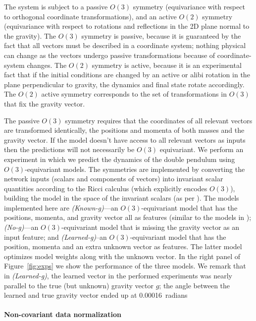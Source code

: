 \documentclass[]{article} %
\newcommand{\figref}[1]{Figure~\ref{#1}}
\begin{document}
The system is subject to a passive $O(3)$ symmetry (equivariance with respect to orthogonal coordinate transformations), and an active $O(2)$ symmetry (equivariance with respect to rotations and reflections in the 2D plane normal to the gravity). 
The $O(3)$ symmetry is passive, because it is guaranteed by the fact that all vectors must be described in a coordinate system; nothing physical can change as the vectors undergo passive transformations because of coordinate-system changes.
The $O(2)$ symmetry is active, because it is an experimental fact that if the initial conditions are changed by an active or alibi rotation in the plane perpendicular to gravity, the dynamics and final state rotate accordingly.
The $O(2)$ active symmetry corresponds to the set of transformations in $O(3)$ that fix the gravity vector. 

The passive $O(3)$ symmetry requires that the coordinates of all relevant vectors are transformed identically, the positions and momenta of both masses and the gravity vector.
If the model doesn't have access to all relevant vectors as inputs then the predictions will not necessarily be $O(3)$ equivariant.
We perform an experiment in which we predict the dynamics of the double pendulum using $O(3)$-equivariant models.
The symmetries are implemented by converting the network inputs (scalars and components of vectors) into invariant scalar quantities according to the Ricci calculus (which explicitly encodes $O(3)$), building the model in the space of the invariant scalars (as per \citealt{villar2021scalars}).
The models implemented here are \textsl{(Known-g)}---an $O(3)$-equivariant model that has the positions, momenta, and gravity vector all as features (similar to the models in \citealt{villar2021scalars, yao2021simple}); \textsl{(No-g)}---an $O(3)$-equivariant model that is missing the gravity vector as an input feature; and \textsl{(Learned-g)}\---an $O(3)$-equivariant model that has the position, momenta and an extra unknown vector as features.
The latter model optimizes model weights along with the unknown vector. 
In the right panel of \figref{fig:exps} we show the performance of the three models.
We remark that in \textsl{(Learned-g)}, the learned vector in the performed experiments was nearly parallel to the true (but unknown) gravity vector $g$; the angle between the learned and true gravity vector ended up at 0.00016~radians

\paragraph{Non-covariant data normalization} 
\end{document}
